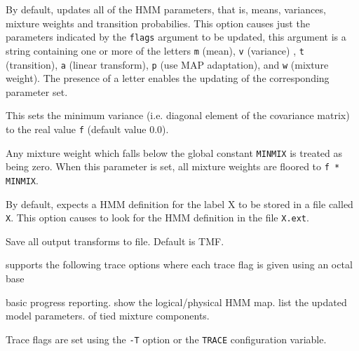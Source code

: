 \begin{optlist}
   By default,  updates all of the HMM parameters,
      that is, means, variances, mixture weights and 
      transition probabilies. This 
      option causes just the parameters indicated by the {\tt flags}
      argument to be updated, this argument is a string containing one
      or more of the letters {\tt m} (mean), {\tt v} (variance) ,
      {\tt t} (transition), {\tt a} (linear transform), {\tt p} (use 
	MAP adaptation), and {\tt w} (mixture weight).  The 
      presence of a letter enables
      the updating of the corresponding parameter set.

    This sets the minimum variance (i.e. diagonal element of
      the covariance matrix) to the real value {\tt f} (default value
      0.0).

    Any mixture weight which falls below the global
            constant {\tt MINMIX} is treated as being zero.
      When this parameter is  set,  all mixture weights  are floored
      to {\tt f * MINMIX}.
      
    By default,  expects a HMM definition for 
      the label X to be stored in a file called {\tt X}.  This
      option causes  to look for the HMM definition in the
      file {\tt X.ext}.

   Save all output transforms to file. Default
	is TMF.

\stdoptB
\stdoptE
\stdoptF
\stdoptG
\stdoptH
\stdoptI
\stdoptJ
\stdoptK
\stdoptL
\stdoptM
\stdoptX

\end{optlist}


 supports the following trace options where each
trace flag is given using an octal base
\begin{optlist}
    basic progress reporting.
    show the logical/physical HMM map.
    list the updated model parameters.
           of tied mixture components.
\end{optlist}


Trace flags are set using the \texttt{-T} option or the  \texttt{TRACE} 
configuration variable.


